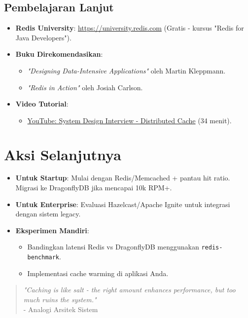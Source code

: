 \documentclass[11pt, a4paper]{book}
\begin{document}
	\subsection{Pembelajaran Lanjut}
	\label{subsec:pembelajaran}
	
	\begin{itemize}
		\item \textbf{Redis University}:  
		\href{https://university.redis.com}{https://university.redis.com} (Gratis - kursus "Redis for Java Developers").
		
		\item \textbf{Buku Direkomendasikan}:  
		\begin{itemize}
			\item \textit{"Designing Data-Intensive Applications"} oleh Martin Kleppmann.
			\item \textit{"Redis in Action"} oleh Josiah Carlson.
		\end{itemize}
		
		\item \textbf{Video Tutorial}:  
		\begin{itemize}
			\item \href{https://www.youtube.com/watch?v=iuqZvajTOyA}{YouTube: System Design Interview - Distributed Cache} (34 menit).
		\end{itemize}
	\end{itemize}
	
	\section*{Aksi Selanjutnya}
	\label{sec:aksi}
	
	\begin{itemize}
		\item \textbf{Untuk Startup}:  
		Mulai dengan Redis/Memcached + pantau hit ratio. Migrasi ke DragonflyDB jika mencapai 10k RPM+.
		
		\item \textbf{Untuk Enterprise}:  
		Evaluasi Hazelcast/Apache Ignite untuk integrasi dengan sistem legacy.
		
		\item \textbf{Eksperimen Mandiri}:  
		\begin{itemize}
			\item Bandingkan latensi Redis vs DragonflyDB menggunakan \texttt{redis-benchmark}.
			\item Implementasi cache warming di aplikasi Anda.
		\end{itemize}
	\end{itemize}
	
	\begin{quote}
		\textit{"Caching is like salt - the right amount enhances performance, but too much ruins the system."} \\
		- Analogi Arsitek Sistem
	\end{quote}
	
\end{document}
